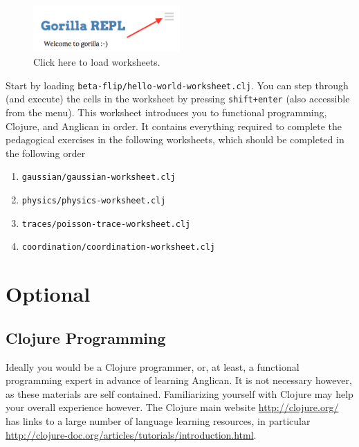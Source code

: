 \documentclass{article}
\begin{document}
\begin{figure}[htbp]
\begin{center}
\includegraphics[width=0.5\textwidth]{gorilla_hint.png}
\caption{Click here to load worksheets.}
\label{gorilla_hint}
\end{center}
\end{figure}


Start by loading \texttt{beta-flip/hello-world-worksheet.clj}.
You can step through (and execute) the cells in the worksheet by pressing \texttt{shift+enter} (also accessible from the menu).  
This worksheet introduces you to functional programming, Clojure, and Anglican in order.  It contains everything required to
complete the pedagogical exercises in the following worksheets, which should be completed in the following order

\begin{enumerate}
\item  \texttt{gaussian/gaussian-worksheet.clj}
\item  \texttt{physics/physics-worksheet.clj}
\item  \texttt{traces/poisson-trace-worksheet.clj}
\item  \texttt{coordination/coordination-worksheet.clj}

\end{enumerate}


\section{Optional}


\subsection{Clojure Programming}

Ideally you would be a Clojure programmer, or, at least, a functional 
programming expert in advance of learning Anglican.  It is not necessary however, as these
materials are self contained.  Familiarizing yourself
with Clojure may help your overall experience however.  The Clojure main website
\url{http://clojure.org/} has links to a large number of language 
learning resources, in particular \url{http://clojure-doc.org/articles/tutorials/introduction.html}.
\end{document}
